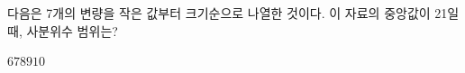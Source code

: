 다음은 7개의 변량을 작은 값부터 크기순으로 나열한 것이다. 이 자료의 중앙값이 21일 때, 사분위수 범위는?
\begin{choices32}{$6$}{$7$}{$8$}{$9$}{$10$}\end{choices32}
